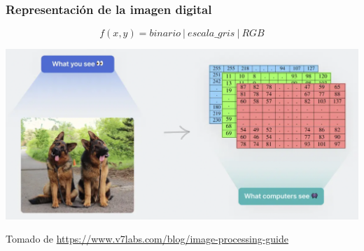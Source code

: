 \documentclass[
10pt, %
aspectratio=169, %
]{beamer}
\begin{document}
	
	\begin{frame}
		
		\frametitle{Representación de la imagen digital}
		
		$$f(x, y) = binario\ |\ escala\_gris\ |\ RGB$$
		
		\centering
		\includegraphics[scale=0.5]{representacion.png} 
			
		{\scriptsize Tomado de \url{https://www.v7labs.com/blog/image-processing-guide}}
	
	\end{frame}
	
\end{document}
